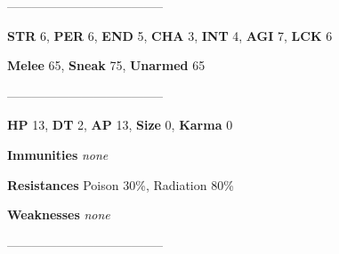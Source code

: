 \documentclass[11pt,a4paper,twocolumn]{book}
\begin{document}
%		
%	
%		

	--------------------------------------

	\noindent
	\textbf{STR} 6, \textbf{PER} 6, \textbf{END} 5, \textbf{CHA} 3, \textbf{INT} 4, \textbf{AGI} 7, \textbf{LCK} 6
	
	\noindent
	\textbf{Melee} 65, \textbf{Sneak} 75, \textbf{Unarmed} 65
	
	--------------------------------------
	
	\noindent
	\textbf{HP} 13, \textbf{DT} 2, \textbf{AP} 13, \textbf{Size} 0, \textbf{Karma} 0
	
	
	\noindent
	\textbf{Immunities} \emph{none} %
	
	\noindent
	\textbf{Resistances} Poison 30\%, Radiation 80\%%
	
	\noindent
	\textbf{Weaknesses} \emph{none} %
	
	--------------------------------------
	
\end{document}
